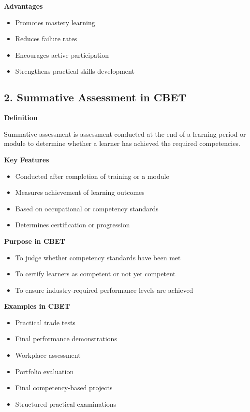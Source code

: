 \documentclass[12pt,a4paper]{article}
\begin{document}
\textbf{Advantages}
\begin{itemize}
    \item Promotes mastery learning
    \item Reduces failure rates
    \item Encourages active participation
    \item Strengthens practical skills development
\end{itemize}

\subsection*{2. Summative Assessment in CBET}

\textbf{Definition}

Summative assessment is assessment conducted at the end of a learning period or module to determine whether a learner has achieved the required competencies.

\textbf{Key Features}
\begin{itemize}
    \item Conducted after completion of training or a module
    \item Measures achievement of learning outcomes
    \item Based on occupational or competency standards
    \item Determines certification or progression
\end{itemize}

\textbf{Purpose in CBET}
\begin{itemize}
    \item To judge whether competency standards have been met
    \item To certify learners as competent or not yet competent
    \item To ensure industry-required performance levels are achieved
\end{itemize}

\textbf{Examples in CBET}
\begin{itemize}
    \item Practical trade tests
    \item Final performance demonstrations
    \item Workplace assessment
    \item Portfolio evaluation
    \item Final competency-based projects
    \item Structured practical examinations
\end{itemize}
\end{document}
